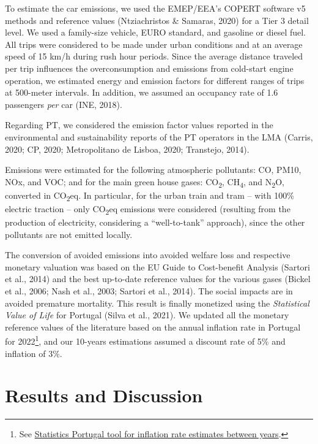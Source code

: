 \documentclass[review, doubleblind, 3p,
authoryear]{elsarticle} %
\begin{document}
To estimate the car emissions, we used the EMEP/EEA's COPERT software v5
methods and reference values (Ntziachristos \& Samaras, 2020) for a Tier
3 detail level. We used a family-size vehicle, EURO standard, and
gasoline or diesel fuel. All trips were considered to be made under
urban conditions and at an average speed of 15 km/h during rush hour
periods. Since the average distance traveled per trip influences the
overconsumption and emissions from cold-start engine operation, we
estimated energy and emission factors for different ranges of trips at
500-meter intervals. In addition, we assumed an occupancy rate of 1.6
passengers \emph{per} car (INE, 2018).

Regarding PT, we considered the emission factor values reported in the
environmental and sustainability reports of the PT operators in the LMA
(Carris, 2020; CP, 2020; Metropolitano de Lisboa, 2020; Transtejo,
2014).

Emissions were estimated for the following atmospheric pollutants: CO,
PM10, NOx, and VOC; and for the main green house gases:
CO\textsubscript{2}, CH\textsubscript{4}, and N\textsubscript{2}O,
converted in CO\textsubscript{2}eq. In particular, for the urban train
and tram -- with 100\% electric traction -- only CO\textsubscript{2}eq
emissions were considered (resulting from the production of electricity,
considering a ``well-to-tank'' approach), since the other pollutants are
not emitted locally.

The conversion of avoided emissions into avoided welfare loss and
respective monetary valuation was based on the EU Guide to Cost-benefit
Analysis (Sartori et al., 2014) and the best up-to-date reference values
for the various gases (Bickel et al., 2006; Nash et al., 2003; Sartori
et al., 2014). The social impacts are in avoided premature mortality.
This result is finally monetized using the \emph{Statistical Value of
Life} for Portugal (Silva et al., 2021). We updated all the monetary
reference values of the literature based on the annual inflation rate in
Portugal for 2022\footnote{See
  \href{https://www.ine.pt/xportal/xmain?xpid=INE\&xpgid=ipc}{Statistics
  Portugal tool for inflation rate estimates between years}.}, and our
10-years estimations assumed a discount rate of 5\% and inflation of
3\%.

\hypertarget{results-and-discussion}{%
\section{Results and Discussion}\label{results-and-discussion}}
\end{document}
